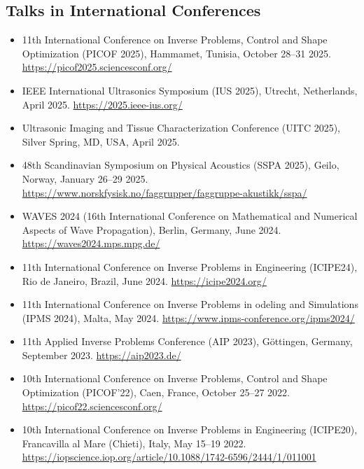 \documentclass[10pt]{article}
\begin{document}
\subsection{Talks in International Conferences}
\begin{itemize}
\item 11th International Conference on Inverse Problems, Control and Shape Optimization (PICOF 2025), Hammamet, Tunisia, October 28--31 2025. \url{https://picof2025.sciencesconf.org/}
\item IEEE International Ultrasonics Symposium (IUS 2025), Utrecht, Netherlands, April 2025. \url{https://2025.ieee-ius.org/}
\item Ultrasonic Imaging and Tissue Characterization Conference (UITC 2025), Silver Spring, MD, USA, April 2025.
\item 48th Scandinavian Symposium on Physical Acoustics (SSPA 2025), Geilo, Norway, January 26--29 2025. \url{https://www.norskfysisk.no/faggrupper/faggruppe-akustikk/sspa/}
\item WAVES 2024 (16th International Conference on Mathematical and Numerical Aspects of Wave Propagation), Berlin, Germany, June 2024. \url{https://waves2024.mps.mpg.de/}
\item 11th International Conference on Inverse Problems in Engineering (ICIPE24), Rio de Janeiro, Brazil, June 2024. \url{https://icipe2024.org/}
\item 11th International Conference on Inverse Problems in odeling and Simulations (IPMS 2024), Malta, May 2024. \url{https://www.ipms-conference.org/ipms2024/}
\item 11th Applied Inverse Problems Conference (AIP 2023), Göttingen, Germany, September 2023. \url{https://aip2023.de/}
\item 10th International Conference on Inverse Problems, Control and Shape Optimization (PICOF'22), Caen, France, October 25--27 2022. \url{https://picof22.sciencesconf.org/}
\item 10th International Conference on Inverse Problems in Engineering (ICIPE20), Francavilla al Mare (Chieti), Italy, May 15--19 2022. \url{https://iopscience.iop.org/article/10.1088/1742-6596/2444/1/011001}
\end{itemize}
\end{document}
